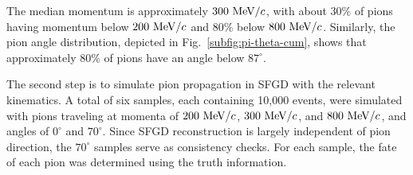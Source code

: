           The median momentum is approximately $300~\textrm{MeV}/c$, with about $30\%$ of pions having momentum below $200~\textrm{MeV}/c$ and $80\%$ below $800~\textrm{MeV}/c$. 
          Similarly, the pion angle distribution, depicted in Fig.~\ref{subfig:pi-theta-cum}, shows that approximately $80\%$ of pions have an angle below $87^\circ$.

          The second step is to simulate pion propagation in SFGD with the relevant kinematics. 
          A total of six samples, each containing 10,000 events, were simulated with pions traveling at momenta of $200~\textrm{MeV}/c$, $300~\textrm{MeV}/c$, and $800~\textrm{MeV}/c$, and angles of $0^\circ$ and $70^\circ$. 
          Since SFGD reconstruction is largely independent of pion direction, the $70^\circ$ samples serve as consistency checks. 
          For each sample, the fate of each pion was determined using the truth information.

